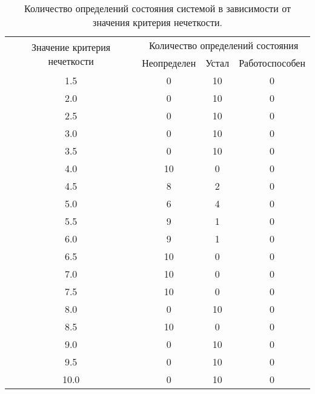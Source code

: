 \begin{table}[H]
	\begin{center}
		\caption{\label{table:time3} Количество определений состояния системой в зависимости от значения критерия нечеткости.}
		\begin{tabular}{|c|ccc|}
			\hline
			\multirow{2}{*}{Значение критерия нечеткости} & \multicolumn{3}{c|}{Количество определений состояния}\\ \cline{2-4} & \multicolumn{1}{c|}{Неопределен} & \multicolumn{1}{c|}{Устал} & Работоспособен \\ \hline
			1.5& \multicolumn{1}{c|}{0}            & \multicolumn{1}{c|}{10}    &0 \\ \hline
			2.0& \multicolumn{1}{c|}{0}            & \multicolumn{1}{c|}{10}      &0 \\ \hline
			2.5& \multicolumn{1}{c|}{0}            & \multicolumn{1}{c|}{10}      &0 \\ \hline
			3.0& \multicolumn{1}{c|}{0}            & \multicolumn{1}{c|}{10}      &0 \\ \hline
			3.5& \multicolumn{1}{c|}{0}            & \multicolumn{1}{c|}{10}      &0 \\ \hline
			4.0& \multicolumn{1}{c|}{10}            & \multicolumn{1}{c|}{0}      &0 \\ \hline
			4.5& \multicolumn{1}{c|}{8}            & \multicolumn{1}{c|}{2}      &0 \\ \hline
			5.0& \multicolumn{1}{c|}{6}            & \multicolumn{1}{c|}{4}      &0 \\ \hline
			5.5& \multicolumn{1}{c|}{9}            & \multicolumn{1}{c|}{1}      &0 \\ \hline
			6.0& \multicolumn{1}{c|}{9}            & \multicolumn{1}{c|}{1}      &0 \\ \hline
			6.5& \multicolumn{1}{c|}{10}            & \multicolumn{1}{c|}{0}      &0 \\ \hline
			7.0& \multicolumn{1}{c|}{10}            & \multicolumn{1}{c|}{0}      &0 \\ \hline
			7.5& \multicolumn{1}{c|}{10}            & \multicolumn{1}{c|}{0}      &0 \\ \hline
			8.0& \multicolumn{1}{c|}{0}            & \multicolumn{1}{c|}{10}      &0 \\ \hline
			8.5& \multicolumn{1}{c|}{10}            & \multicolumn{1}{c|}{0}      &0 \\ \hline
			9.0& \multicolumn{1}{c|}{0}            & \multicolumn{1}{c|}{10}      &0 \\ \hline
			9.5& \multicolumn{1}{c|}{0}            & \multicolumn{1}{c|}{10}      &0 \\ \hline
			10.0& \multicolumn{1}{c|}{0}            & \multicolumn{1}{c|}{10}     &0 \\ \hline
		\end{tabular}
	\end{center}
\end{table}

